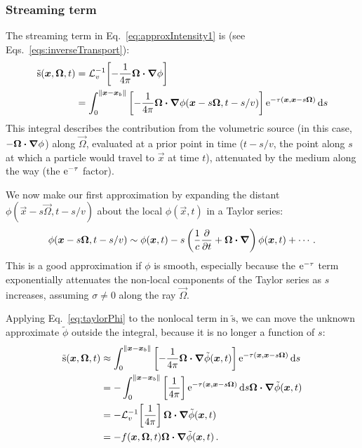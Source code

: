 \subsubsection{Streaming term}
The streaming term in Eq.~\eqref{eq:approxIntensity1} is (see
Eqs.~\eqref{eqs:inverseTransport}):
\begin{align*}
  \mathrm{ \tilde s }(\bm{x}, \bm{\Omega}, t) &=
    \mathcal{L}_{v}^{-1}\!\left[ -\frac1{4\pi}\bm{\Omega}\bm{\cdot} \bm{\nabla} \phi \right]
  \\
  &= \int_{0}^{\left\| \bm{x} - \bm{x}_b \right\|}
    \left[ -\frac1{4\pi}\bm{\Omega}\bm{\cdot} \bm{\nabla} \phi(\bm{x} - s \bm{\Omega},
    t-s/v)
    \right]
    \mathop{}\!\mathrm{e}^{ -\tau(\bm{x}, \bm{x} - s \bm{\Omega})}
    \mathop{}\!\mathrm{d} s
\end{align*}
This integral describes the contribution from the volumetric source (in this
case, $-\bm{\Omega}\bm{\cdot}\bm{\nabla}\phi$) along $\vec{\Omega}$, evaluated at a prior
point in time ($t-s/v$, the point along $s$ at which a particle would travel
to $\vec{x}$ at time $t$), attenuated by the medium along the way (the
$\mathop{}\!\mathrm{e}^{ -\tau }$ factor).

We now make our first approximation by expanding the distant $\phi(\vec{x} - s
\vec{\Omega}, t-s/v)$ about the local $\phi(\vec{x}, t)$ in a Taylor series:
\begin{equation} \label{eq:taylorPhi}
  \phi(\bm{x} - s \bm{\Omega}, t-s/v)
  \sim \phi(\bm{x},t) - s \left( \frac{1}{c} \frac{\partial }{\partial t} + \bm{\Omega} \bm{\cdot}
  \bm{\nabla}  \right) \phi (\bm{x}, t) + \cdots \,.
\end{equation}
This is a good approximation if $\phi$ is smooth, especially because the
$\mathop{}\!\mathrm{e}^{ -\tau }$ term exponentially attenuates the non-local components of the
Taylor series as $s$ increases, assuming $\sigma\ne 0$ along the ray
$\vec{\Omega}$.

Applying Eq.~\eqref{eq:taylorPhi} to the nonlocal term in $\mathrm{ \tilde s
}$, we can move the unknown approximate $\tilde \phi$ outside the integral,
because it is no longer a function of $s$:
\begin{align}\nonumber
  \mathrm{ \tilde s }(\bm{x}, \bm{\Omega}, t)
  &\approx \int_{0}^{\left\| \bm{x} - \bm{x}_b \right\|}
    \left[ -\frac1{4\pi}\bm{\Omega}\bm{\cdot} \bm{\nabla} \tilde\phi(\bm{x},t) \right]
    \mathop{}\!\mathrm{e}^{ -\tau(\bm{x}, \bm{x} - s \bm{\Omega})}
    \mathop{}\!\mathrm{d} s
  \\\nonumber
  &= - \int_{0}^{\left\| \bm{x} - \bm{x}_b \right\|}
    \left[ \frac1{4\pi}\right]
    \mathop{}\!\mathrm{e}^{ -\tau(\bm{x}, \bm{x} - s \bm{\Omega})} \mathop{}\!\mathrm{d} s
    \bm{\Omega}\bm{\cdot} \bm{\nabla} \tilde \phi(\bm{x},t)
  \\\nonumber
  &= - \mathcal{L}_{v}^{-1}\!\left[ \frac1{4\pi} \right] \bm{\Omega}\bm{\cdot} \bm{\nabla} \tilde \phi(\bm{x},t)
  \\\label{eq:tildeS}
  &= -f(\bm{x}, \bm{\Omega}, t) \bm{\Omega}\bm{\cdot} \bm{\nabla} \tilde \phi(\bm{x},t)
  \,.
\end{align}

